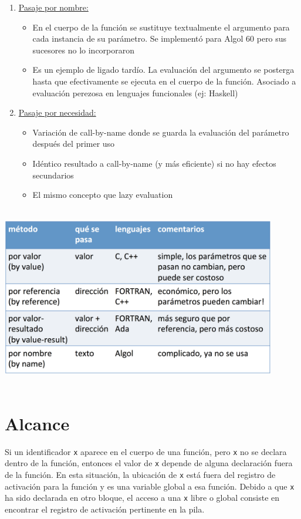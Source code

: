 \documentclass[10pt,a4paper]{report}
\begin{document}
\begin{enumerate}
	\item \underline{Pasaje por nombre:}
	\begin{itemize}
	\item En el cuerpo de la función se sustituye textualmente el argumento 
	para cada instancia de su parámetro. Se implementó para Algol 60 pero 
	sus sucesores no lo 	incorporaron
  	\item Es un ejemplo de ligado tardío. La evaluación del argumento se 
  	posterga hasta que efectivamente se ejecuta en el cuerpo de la función.
	Asociado a evaluación perezosa en lenguajes funcionales (ej: Haskell)
	\end{itemize}
	
	\item \underline{Pasaje por necesidad:}
	\begin{itemize}
	\item Variación de call-by-name donde se guarda la evaluación del 
	parámetro después del primer uso
	\item Idéntico resultado a call-by-name (y más eficiente) si no hay 
	efectos secundarios
	\item El mismo concepto que lazy evaluation
	\end{itemize}

\end{enumerate}

\begin{center} 	
		\includegraphics[width=12cm, height=8cm]{resumenpasajes.png}
\end{center}

\section{Alcance}
\par Si un identificador \verb|x| aparece en el cuerpo de una función, pero
\verb|x| no se declara dentro de la función, entonces el valor de
\verb|x| depende de alguna declaración fuera de la función. En esta
situación, la ubicación de \verb|x| está fuera del registro de
activación para la función y es una variable global a esa
función. Debido a que \verb|x| ha sido declarada en otro bloque, el
acceso a una \verb|x| libre o global consiste en encontrar el registro
de activación pertinente en la pila.
\end{document}
